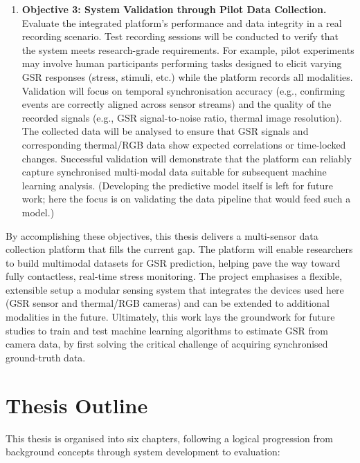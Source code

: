 \begin{enumerate}
    \item \textbf{Objective 3: System Validation through Pilot Data Collection.} Evaluate the integrated platform's performance and data integrity in a real recording scenario. Test recording sessions will be conducted to verify that the system meets research-grade requirements. For example, pilot experiments may involve human participants performing tasks designed to elicit varying GSR responses (stress, stimuli, etc.) while the platform records all modalities. Validation will focus on temporal synchronisation accuracy (e.g., confirming events are correctly aligned across sensor streams) and the quality of the recorded signals (e.g., GSR signal-to-noise ratio, thermal image resolution). The collected data will be analysed to ensure that GSR signals and corresponding thermal/RGB data show expected correlations or time-locked changes. Successful validation will demonstrate that the platform can reliably capture synchronised multi-modal data suitable for subsequent machine learning analysis. (Developing the predictive model itself is left for future work; here the focus is on validating the data pipeline that would feed such a model.)
\end{enumerate}

By accomplishing these objectives, this thesis delivers a multi-sensor data collection platform that fills the current gap. The platform will enable researchers to build multimodal datasets for GSR prediction, helping pave the way toward fully contactless, real-time stress monitoring. The project emphasises a flexible, extensible setup \textemdash a modular sensing system \textemdash that integrates the devices used here (GSR sensor and thermal/RGB cameras) and can be extended to additional modalities in the future. Ultimately, this work lays the groundwork for future studies to train and test machine learning algorithms to estimate GSR from camera data, by first solving the critical challenge of acquiring synchronised ground-truth data.


\section{Thesis Outline}
This thesis is organised into six chapters, following a logical progression from background concepts through system development to evaluation:

